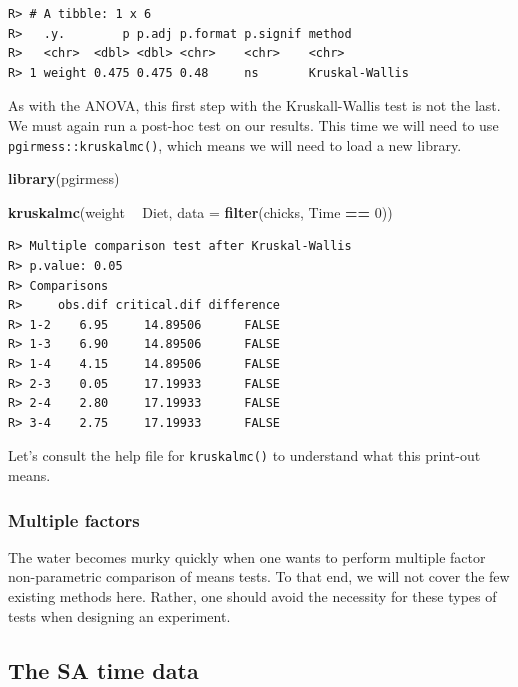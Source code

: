\documentclass[english,10pt,a4paper,oneside]{book}
\newenvironment{Shaded}{\begin{snugshade}}{\end{snugshade}}
\newcommand{\KeywordTok}[1]{\textcolor[rgb]{0.13,0.29,0.53}{\textbf{#1}}}
\newcommand{\DataTypeTok}[1]{\textcolor[rgb]{0.13,0.29,0.53}{#1}}
\newcommand{\DecValTok}[1]{\textcolor[rgb]{0.00,0.00,0.81}{#1}}
\newcommand{\StringTok}[1]{\textcolor[rgb]{0.31,0.60,0.02}{#1}}
\newcommand{\OperatorTok}[1]{\textcolor[rgb]{0.81,0.36,0.00}{\textbf{#1}}}
\newcommand{\NormalTok}[1]{#1}
\theoremstyle{definition}
\theoremstyle{definition}
\theoremstyle{definition}
\theoremstyle{remark}
\begin{document}
\begin{verbatim}
R> # A tibble: 1 x 6
R>   .y.        p p.adj p.format p.signif method        
R>   <chr>  <dbl> <dbl> <chr>    <chr>    <chr>         
R> 1 weight 0.475 0.475 0.48     ns       Kruskal-Wallis
\end{verbatim}

As with the ANOVA, this first step with the Kruskall-Wallis test is not
the last. We must again run a post-hoc test on our results. This time we
will need to use \texttt{pgirmess::kruskalmc()}, which means we will
need to load a new library.

\begin{Shaded}
\begin{Highlighting}[]
\KeywordTok{library}\NormalTok{(pgirmess)}

\KeywordTok{kruskalmc}\NormalTok{(weight }\OperatorTok{~}\StringTok{ }\NormalTok{Diet, }\DataTypeTok{data =} \KeywordTok{filter}\NormalTok{(chicks, Time }\OperatorTok{==}\StringTok{ }\DecValTok{0}\NormalTok{))}
\end{Highlighting}
\end{Shaded}

\begin{verbatim}
R> Multiple comparison test after Kruskal-Wallis 
R> p.value: 0.05 
R> Comparisons
R>     obs.dif critical.dif difference
R> 1-2    6.95     14.89506      FALSE
R> 1-3    6.90     14.89506      FALSE
R> 1-4    4.15     14.89506      FALSE
R> 2-3    0.05     17.19933      FALSE
R> 2-4    2.80     17.19933      FALSE
R> 3-4    2.75     17.19933      FALSE
\end{verbatim}

Let's consult the help file for \texttt{kruskalmc()} to understand what
this print-out means.

\subsubsection{Multiple factors}\label{multiple-factors-1}

The water becomes murky quickly when one wants to perform multiple
factor non-parametric comparison of means tests. To that end, we will
not cover the few existing methods here. Rather, one should avoid the
necessity for these types of tests when designing an experiment.

\subsection{The SA time data}\label{the-sa-time-data}
\end{document}

